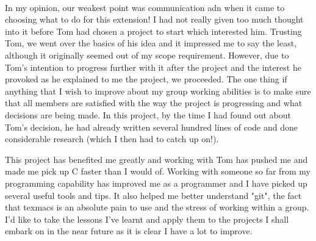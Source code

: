 \documentclass[11pt]{article}
\begin{document}
\\
\indent In my opinion, our weakest point was communication adn when it came to choosing what to do for this extension! I had not really given too much thought into it before Tom had chosen a project to start which interested him. Trusting Tom, we went over the basics of his idea and it impressed me to say the least, although it originally seemed out of my scope requirement. However, due to Tom's intention to progress further with it after the project and the interest he provoked as he explained to me the project, we proceeded. 
The one thing if anything that I wish to improve about my group working abilities is to make sure that all members are satisfied with the way the project is progressing and what decisions are being made. In this project, by the time I had found out about Tom's decision, he had already written several hundred lines of code and done considerable research (which I then had to catch up on!).

\indent This project has benefited me greatly and working with Tom has pushed me and made me pick up C faster than I would of. Working with someone so far from my programming capability has improved me as a programmer and I have picked up several useful tools and tips. It also helped me better understand "git", the fact that texmacs is an absolute pain to use and the stress of working within a group. I'd like to take the lessons I've learnt and apply them to the projects I shall embark on in the near future as it is clear I have a lot to improve.
\end{document}
